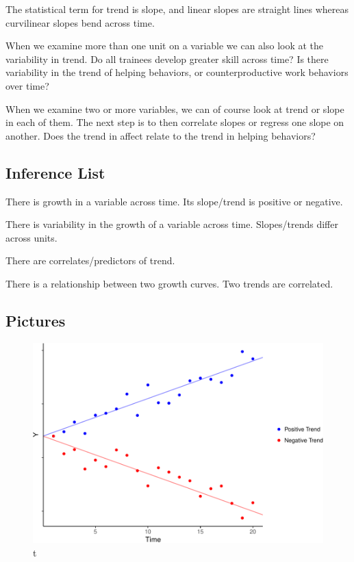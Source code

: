 \documentclass[english,,man]{apa6}
\theoremstyle{definition}
\theoremstyle{definition}
\theoremstyle{definition}
\theoremstyle{remark}
\begin{document}
The statistical term for trend is slope, and linear slopes are straight
lines whereas curvilinear slopes bend across time.

When we examine more than one unit on a variable we can also look at the
variability in trend. Do all trainees develop greater skill across time?
Is there variability in the trend of helping behaviors, or
counterproductive work behaviors over time?

When we examine two or more variables, we can of course look at trend or
slope in each of them. The next step is to then correlate slopes or
regress one slope on another. Does the trend in affect relate to the
trend in helping behaviors?

\hypertarget{inference-list-1}{%
\subsection{Inference List}\label{inference-list-1}}

There is growth in a variable across time. Its slope/trend is positive
or negative.

There is variability in the growth of a variable across time.
Slopes/trends differ across units.

There are correlates/predictors of trend.

There is a relationship between two growth curves. Two trends are
correlated.

\hypertarget{pictures-1}{%
\subsection{Pictures}\label{pictures-1}}

\begin{figure}
\centering
\includegraphics{figures/unnamed-chunk-10-1.pdf}
\caption{\label{fig:unnamed-chunk-10}t\label{trend}}
\end{figure}
\end{document}
